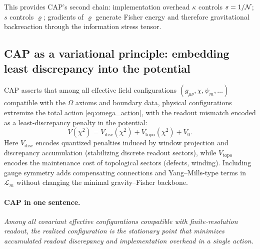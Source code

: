 This provides CAP's second chain: implementation overhead $\kappa$ controls $s=1/\mathcal{N}$; $s$ controls $\varrho$; gradients of $\varrho$ generate Fisher energy and therefore gravitational backreaction through the information stress tensor.

\subsection{CAP as a variational principle: embedding least discrepancy into the potential}
\label{subsec:cap_statement}

CAP asserts that among all effective field configurations $(g_{\mu\nu},\chi,\psi_m,\dots)$ compatible with the $\Omega$ axioms and boundary data, physical configurations extremize the total action \eqref{eq:omega_action}, with the readout mismatch encoded as a least-discrepancy penalty in the potential:
\begin{equation}
  V(\chi^{2}) = V_{\mathrm{disc}}(\chi^{2}) + V_{\mathrm{topo}}(\chi^{2}) + V_{0}.
\end{equation}
Here $V_{\mathrm{disc}}$ encodes quantized penalties induced by window projection and discrepancy accumulation (stabilizing discrete readout sectors), while $V_{\mathrm{topo}}$ encodes the maintenance cost of topological sectors (defects, winding). Including gauge symmetry adds compensating connections and Yang--Mills-type terms in $\mathcal{L}_{m}$ without changing the minimal gravity--Fisher backbone.

\paragraph{CAP in one sentence.}
\emph{Among all covariant effective configurations compatible with finite-resolution readout, the realized configuration is the stationary point that minimizes accumulated readout discrepancy and implementation overhead in a single action.}


